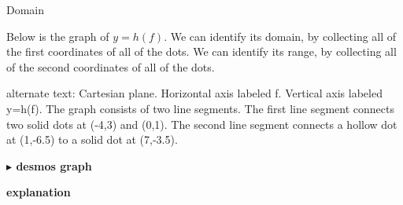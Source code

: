 \documentclass{ximera}
\begin{document}
\begin{example} Domain


Below is the graph of $y=h(f)$. We can identify its domain, by collecting all of the first coordinates of all of the dots.   We can identify its range, by collecting all of the second coordinates of all of the dots.  


\begin{image}
\end{image}


\textcolor{gray!90}{alternate text: Cartesian plane. Horizontal axis labeled f. Vertical axis labeled y=h(f). The graph consists of two line segments. The first line segment connects two solid dots at (-4,3) and (0,1). The second line segment connects a hollow dot at (1,-6.5) to a solid dot at (7,-3.5).}





\begin{onlineOnly}
\textbf{\textcolor{blue!55!black}{$\blacktriangleright$ desmos graph}} 
\begin{center}
\end{center}
\end{onlineOnly}







\textbf{\textcolor{red!75!green}{explanation}} 



\end{example}
\end{document}
